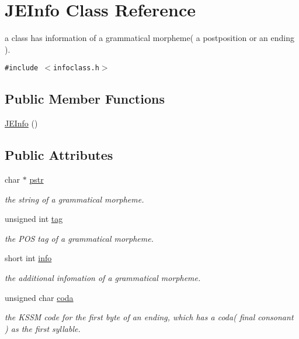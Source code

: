 \hypertarget{classJEInfo}{
\section{JEInfo Class Reference}
\label{classJEInfo}
}
a class has information of a grammatical morpheme( a postposition or an ending ).  


{\tt \#include $<$infoclass.h$>$}

\subsection*{Public Member Functions}
\begin{CompactItemize}
\item 
\hyperlink{classJEInfo_4479c606003581bbc47d1ef3cd3ab654}{JEInfo} ()
\end{CompactItemize}
\subsection*{Public Attributes}
\begin{CompactItemize}
\item 
char $\ast$ \hyperlink{classJEInfo_26f7a8dc6274d7599b112a8d8890c768}{pstr}
\begin{CompactList}\small\item\em the string of a grammatical morpheme. \item\end{CompactList}\item 
unsigned int \hyperlink{classJEInfo_66e1bd182ba8e9a314ab2db35365188b}{tag}
\begin{CompactList}\small\item\em the POS tag of a grammatical morpheme. \item\end{CompactList}\item 
short int \hyperlink{classJEInfo_ce5273ed935ff3a80e874c67601c27d4}{info}
\begin{CompactList}\small\item\em the additional infomation of a grammatical morpheme. \item\end{CompactList}\item 
unsigned char \hyperlink{classJEInfo_ce3fb759b740683f578ced18cb30db2d}{coda}
\begin{CompactList}\small\item\em the KSSM code for the first byte of an ending, which has a coda( final consonant ) as the first syllable. \item\end{CompactList}\end{CompactItemize}


